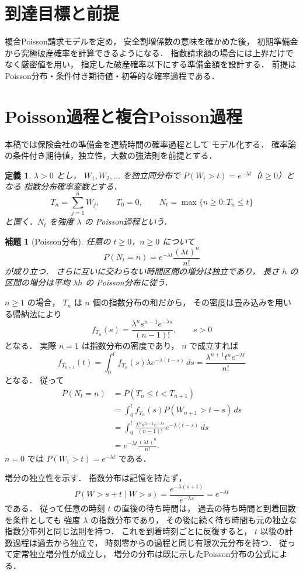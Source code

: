 \documentclass[a5paper,10pt,onecolumn]{jsarticle}
\makeatletter
\theoremstyle{mathnotetheorem}
\newtheorem{definition}[theorem]{定義}
\newtheorem{lemma}[theorem]{補題}
\renewcommand{\proofname}{証明}
\renewenvironment{proof}[1][\proofname]{%
  \par\pushQED{\qed}\normalfont\topsep4\p@\@plus2\p@\relax
  \trivlist\item[\hskip\labelsep\bfseries #1]\ignorespaces
}{\popQED\endtrivlist\@endpefalse}
\makeatother
\begin{document}
\section*{到達目標と前提}
複合Poisson請求モデルを定め，
安全割増係数の意味を確かめた後，
初期準備金から究極破産確率を計算できるようになる．
指数請求額の場合には上界だけでなく厳密値を用い，
指定した破産確率以下にする準備金額を設計する．
前提はPoisson分布・条件付き期待値・初等的な確率過程である．


\section{Poisson過程と複合Poisson過程}

本稿では保険会社の準備金を連続時間の確率過程として
モデル化する．
確率論の条件付き期待値，独立性，大数の強法則を前提とする．

\begin{definition}
$\lambda>0$ とし，
$W_1,W_2,\dots$ を独立同分布で
$P(W_i>t)=e^{-\lambda t}$（$t\ge0$）となる
指数分布確率変数とする．
\[
 T_n=\sum_{j=1}^n W_j,\qquad T_0=0,\qquad
 N_t=\max\{n\ge0:T_n\le t\}
\]
と置く．$N_t$ を強度 $\lambda$ の
\emph{Poisson過程}という．
\end{definition}

\begin{lemma}[Poisson分布]\label{lem:poisson}
任意の $t\ge0$，$n\ge0$ について
\[
 P(N_t=n)=e^{-\lambda t}\frac{(\lambda t)^n}{n!}
\]
が成り立つ．
さらに互いに交わらない時間区間の増分は独立であり，
長さ $h$ の区間の増分は平均 $\lambda h$ の
Poisson分布に従う．
\end{lemma}
\begin{proof}
$n\ge1$ の場合，
$T_n$ は $n$ 個の指数分布の和だから，
その密度は畳み込みを用いる帰納法により
\[
 f_{T_n}(s)
 =\frac{\lambda^n s^{n-1}e^{-\lambda s}}{(n-1)!},
 \qquad s>0
\]
となる．
実際 $n=1$ は指数分布の密度であり，
$n$ で成立すれば
\[
 f_{T_{n+1}}(t)
 =\int_0^t f_{T_n}(s)\lambda e^{-\lambda(t-s)}\,ds
 =\frac{\lambda^{n+1}t^ne^{-\lambda t}}{n!}
\]
となる．
従って
\begin{align*}
 P(N_t=n)
 &=P(T_n\le t<T_{n+1})\\
 &=\int_0^t f_{T_n}(s)P(W_{n+1}>t-s)\,ds\\
 &=\int_0^t
 \frac{\lambda^ns^{n-1}e^{-\lambda s}}{(n-1)!}
 e^{-\lambda(t-s)}\,ds\\
 &=e^{-\lambda t}\frac{(\lambda t)^n}{n!}.
\end{align*}
$n=0$ では $P(W_1>t)=e^{-\lambda t}$ である．

増分の独立性を示す．
指数分布は記憶を持たず，
\[
 P(W>s+t\mid W>s)
 =\frac{e^{-\lambda(s+t)}}{e^{-\lambda s}}
 =e^{-\lambda t}
\]
である．
従って任意の時刻 $t$ の直後の待ち時間は，
過去の待ち時間と到着回数を条件としても
強度 $\lambda$ の指数分布であり，
その後に続く待ち時間も元の独立な指数分布列と同じ法則を持つ．
これを到着時刻ごとに反復すると，
$t$ 以後の計数過程は過去から独立で，
時刻零からの過程と同じ有限次元分布を持つ．
従って定常独立増分性が成立し，
増分の分布は既に示したPoisson分布の公式による．
\end{proof}
\end{document}
